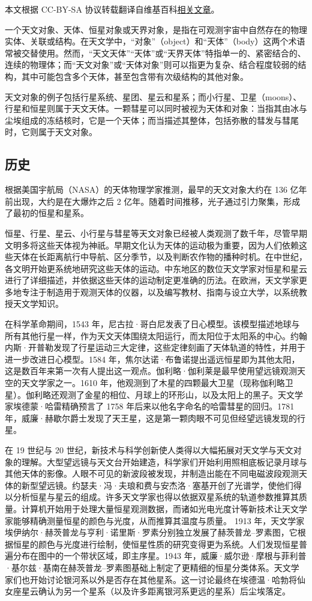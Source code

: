 
本文根据 CC-BY-SA 协议转载翻译自维基百科\href{https://en.wikipedia.org/wiki/Astronomical_object}{相关文章}。

一个天文对象、天体、恒星对象或天界对象，是指在可观测宇宙中自然存在的物理实体、关联或结构。在天文学中，“对象”（object）和“天体”（body）这两个术语常被交替使用。然而，“天文天体”“天体”或“天界天体”特指单一的、紧密结合的、连续的物理体；而“天文对象”或“天体对象”则可以指更为复杂、结合程度较弱的结构，其中可能包含多个天体，甚至包含带有次级结构的其他对象。

天文对象的例子包括行星系统、星团、星云和星系；而小行星、卫星（moons）、行星和恒星则属于天文天体。一颗彗星可以同时被视为天体和对象：当指其由冰与尘埃组成的冻结核时，它是一个天体；而当描述其整体，包括弥散的彗发与彗尾时，它则属于天文对象。
\subsection{历史}
根据美国宇航局（NASA）的天体物理学家推测，最早的天文对象大约在 136 亿年前出现，大约是在大爆炸之后 2 亿年。随着时间推移，光子通过引力聚集，形成了最初的恒星和星系。

恒星、行星、星云、小行星与彗星等天文对象已经被人类观测了数千年，尽管早期文明多将这些天体视为神祇。早期文化认为天体的运动极为重要，因为人们依赖这些天体在长距离航行中导航、区分季节，以及判断农作物的播种时机。在中世纪，各文明开始更系统地研究这些天体的运动。中东地区的数位天文学家对恒星和星云进行了详细描述，并依据这些天体的运动制定更准确的历法。在欧洲，天文学家更多地专注于制造用于观测天体的仪器，以及编写教材、指南与设立大学，以系统教授天文学知识。

在科学革命期间，1543 年，尼古拉·哥白尼发表了日心模型。该模型描述地球与所有其他行星一样，作为天文天体围绕太阳运行，而太阳位于太阳系的中心。约翰内斯·开普勒发现了行星运动三大定律，这些定律刻画了天体轨道的特性，并用于进一步改进日心模型。1584 年，焦尔达诺·布鲁诺提出遥远恒星即为其他太阳，这是数百年来第一次有人提出这一观点。伽利略·伽利莱是最早使用望远镜观测天空的天文学家之一。1610 年，他观测到了木星的四颗最大卫星（现称伽利略卫星）。伽利略还观测了金星的相位、月球上的环形山，以及太阳上的黑子。天文学家埃德蒙·哈雷精确预言了 1758 年后来以他名字命名的哈雷彗星的回归。1781 年，威廉·赫歇尔爵士发现了天王星，这是第一颗肉眼不可见但经望远镜发现的行星。

在 19 世纪与 20 世纪，新技术与科学创新使人类得以大幅拓展对天文学与天文对象的理解。大型望远镜与天文台开始建造，科学家们开始利用照相底板记录月球与其他天体的影像。人眼不可见的新波段被发现，并制造出能在不同电磁波段观测天体的新型望远镜。约瑟夫·冯·夫琅和费与安杰洛·塞基开创了光谱学，使他们得以分析恒星与星云的组成。许多天文学家也得以依据双星系统的轨道参数推算其质量。计算机开始用于处理大量恒星观测数据，而诸如光电光度计等新技术让天文学家能够精确测量恒星的颜色与光度，从而推算其温度与质量。
1913 年，天文学家埃伊纳尔·赫茨普龙与亨利·诺里斯·罗素分别独立发展了赫茨普龙–罗素图，它根据恒星的颜色与光度进行绘制，使恒星性质的研究变得更为系统。人们发现恒星普遍分布在图中的一个带状区域，即主序星。1943 年，威廉·威尔逊·摩根与菲利普·基尔兹·基南在赫茨普龙–罗素图基础上制定了更精细的恒星分类体系。天文学家们也开始讨论银河系以外是否存在其他星系。这一讨论最终在埃德温·哈勃将仙女座星云确认为另一个星系（以及许多距离银河系更远的星系）后尘埃落定。
